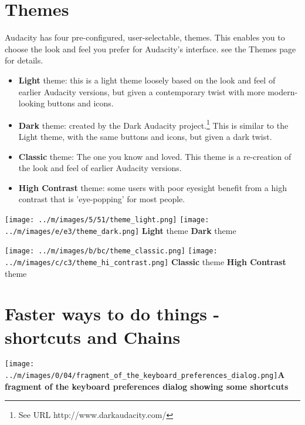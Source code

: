 \documentclass[twocolumn]{book}
\begin{document}

\section{Themes}


Audacity has four pre-configured, user-selectable, themes.  This enables you to choose the look and feel you prefer for Audacity's interface. see the Themes page for details.
\begin{itemize}
\item \textbf{Light} theme: this is a light theme loosely based on the look and feel of earlier Audacity versions, but given a contemporary twist with more modern-looking buttons and icons. 
\item \textbf{Dark} theme: created by the Dark Audacity project.\footnote{See URL http://www.darkaudacity.com/} This is similar to the Light theme, with the same buttons and icons, but given a dark twist.
\item \textbf{Classic} theme: The one you know and loved. This theme is a re-creation of the look and feel of earlier Audacity versions. 
\item \textbf{High Contrast} theme: some users with poor eyesight benefit from a high contrast that is 'eye-popping' for most people.
\end{itemize}

\* \* \* \* \texttt{[image: ../m/images/5/51/theme\_light.png]}
\* \* \* \* \texttt{[image: ../m/images/e/e3/theme\_dark.png]}
\* \* \* \* 
\textbf{Light} theme
\* \* \* \* 
\textbf{Dark} theme


\* \* \* \* \texttt{[image: ../m/images/b/bc/theme\_classic.png]}
\* \* \* \* \texttt{[image: ../m/images/c/c3/theme\_hi\_contrast.png]}
\* \* \* \* 
\textbf{Classic} theme
\* \* \* \* 
\textbf{High Contrast} theme




\section{Faster ways to do things - shortcuts and Chains}

\texttt{[image: ../m/images/0/04/fragment\_of\_the\_keyboard\_preferences\_dialog.png]}\textbf{A fragment of the keyboard preferences dialog showing some shortcuts}
\end{document}
